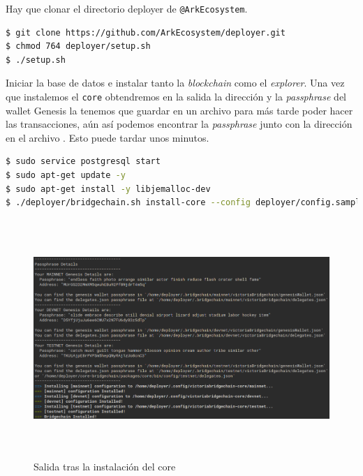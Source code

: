 Hay que clonar el directorio deployer de \texttt{@ArkEcosystem}.\\

\begin{lstlisting}[language=Bash,caption=Instalación \textit{blockchain}. Parte IX, label=cod:clone-ark, style=Consola]
$ git clone https://github.com/ArkEcosystem/deployer.git
$ chmod 764 deployer/setup.sh
$ ./setup.sh
\end{lstlisting}

Iniciar la base de datos e instalar tanto la \textit{blockchain} como el \textit{explorer}. Una vez que instalemos el \texttt{core} obtendremos en la salida la dirección y la \textit{passphrase} del wallet Genesis la tenemos que guardar en un archivo para más tarde poder hacer las transacciones, aún así podemos encontrar la \textit{passphrase} junto con la dirección en el archivo . Esto puede tardar unos minutos.
\begin{lstlisting}[language=Bash,caption=Instalación \textit{blockchain}. Parte X, label=cod:install-bridgechain, style=Consola]
$ sudo service postgresql start
$ sudo apt-get update -y 
$ sudo apt-get install -y libjemalloc-dev
$ ./deployer/bridgechain.sh install-core --config deployer/config.sample.conf --autoinstall-deps --non-interactive
\end{lstlisting}

\begin{figure}[h]
	\centering
	\includegraphics[width=15cm,height=9cm]{figuras/Instalacion_bridgechain.png}
	\caption{Salida tras la instalación del core}
	\label{fig:install-bridge}
\end{figure}

